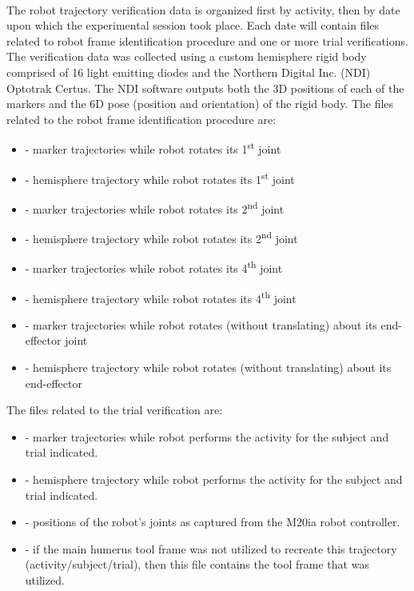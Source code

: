 \documentclass[letterpaper]{article}
\begin{document}
\paragraph{}
The robot trajectory verification data is organized first by activity, then by date upon which the experimental session took place. Each date will contain files related to robot frame identification procedure and one or more trial verifications. The verification data was collected using a custom hemisphere rigid body comprised of 16 light emitting diodes and the Northern Digital Inc. (NDI) Optotrak Certus. The NDI software outputs both the 3D positions of each of the markers and the 6D pose (position and orientation) of the rigid body. The files related to the robot frame identification procedure are:
\begin{itemize}
	\item {} - marker trajectories while robot rotates its 1\textsuperscript{st} joint
	\item {} - hemisphere trajectory while robot rotates its 1\textsuperscript{st} joint
	\item {} - marker trajectories while robot rotates its 2\textsuperscript{nd} joint
	\item {} - hemisphere trajectory while robot rotates its 2\textsuperscript{nd} joint
	\item {} - marker trajectories while robot rotates its 4\textsuperscript{th} joint
	\item {} - hemisphere trajectory while robot rotates its 4\textsuperscript{th} joint
	\item {} - marker trajectories while robot rotates (without translating) about its end-effector joint
	\item {}  - hemisphere trajectory while robot rotates (without translating) about its end-effector
\end{itemize}
The files related to the trial verification are:
\begin{itemize}
	\item {} - marker trajectories while robot performs the activity for the subject and trial indicated.
	\item {} - hemisphere trajectory while robot performs the activity for the subject and trial indicated.
	\item {} - positions of the robot's joints as captured from the M20ia robot controller.
	\item {} - if the main humerus tool frame was not utilized to recreate this trajectory (activity/subject/trial), then this file contains the tool frame that was utilized.
\end{itemize}
\end{document}
